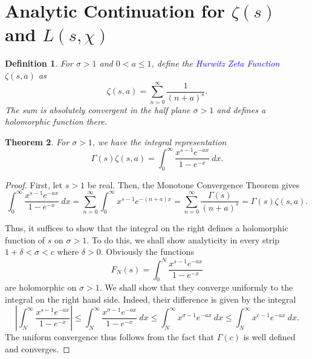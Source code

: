 \documentclass[12pt]{article}
\theoremstyle{thmstyle}
\newtheorem{theorem}{Theorem}[section]
\theoremstyle{defstyle}
\newtheorem{definition}[theorem]{Definition}
\newcommand{\define}[1]{\textcolor{blue}{\textit{#1}}}
\renewcommand{\le}{\leqslant}
\begin{document}

\section{Analytic Continuation for \texorpdfstring{$\zeta(s)$}{} and \texorpdfstring{$L(s,\chi)$}{}}

\begin{definition}
    For $\sigma > 1$ and $0 < a \le 1$, define the \define{Hurwitz Zeta Function} $\zeta(s, a)$ as 
    \begin{equation*}
        \zeta(s, a) = \sum_{n = {0}}^\infty\frac{1}{(n + a)^s}.
    \end{equation*}
    The sum is absolutely convergent in the half plane $\sigma > 1$ and defines a holomorphic function there.
\end{definition}

\begin{theorem}
    For $\sigma > 1$, we have the integral representation 
    \begin{equation*}
        \Gamma(s)\zeta(s, a) = \int_0^\infty\frac{x^{s - 1}e^{-ax}}{1 - e^{-x}}~dx.
    \end{equation*}
\end{theorem}
\begin{proof}
    First, let $s > 1$ be real. Then, the Monotone Convergence Theorem gives 
    \begin{equation*}
        \int_0^\infty\frac{x^{s - 1}e^{-ax}}{1 - e^{-x}}~dx = \sum_{n = 0}^\infty \int_0^\infty x^{s - 1}e^{-(n + a)x} = \sum_{n = 0}^\infty\frac{\Gamma(s)}{(n + a)^s} = \Gamma(s)\zeta(s , a).
    \end{equation*}

    Thus, it suffices to show that the integral on the right defines a holomorphic function of $s$ on $\sigma > 1$. To do this, we shall show analyticity in every strip $1 + \delta < \sigma < c$ where $\delta > 0$. Obviously the functions 
    \begin{equation*}
        F_N(s) = \int_0^N \frac{x^{s - 1}e^{-ax}}{1 - e^{-x}}
    \end{equation*}
    are holomorphic on $\sigma > 1$. We shall show that they converge uniformly to the integral on the right hand side. Indeed, their difference is given by the integral 
    \begin{equation*}
        \left|\int_N^\infty\frac{x^{s - 1}e^{-ax}}{1 - e^{-x}}\right|\le\int_N^\infty\frac{x^{\sigma - 1}e^{-ax}}{1 - e^{-x}}~dx\le\int_N^\infty x^{\sigma - 1}e^{-ax}~dx\le\int_N^\infty x^{c - 1}e^{-ax}~dx.
    \end{equation*}
    The uniform convergence thus follows from the fact that $\Gamma(c)$ is well defined and converges.
\end{proof}
\end{document}
